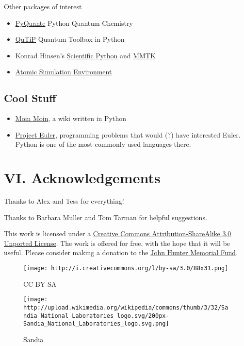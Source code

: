 \documentclass[11pt]{article}
\makeatletter
\def\maxwidth{\ifdim\Gin@nat@width>\linewidth\linewidth
    \else\Gin@nat@width\fi}
\let\Oldincludegraphics\includegraphics
\renewcommand{\includegraphics}[1]{\Oldincludegraphics[width=.8\maxwidth]{#1}}
\providecommand{\tightlist}{%
      \setlength{\itemsep}{0pt}\setlength{\parskip}{0pt}}
\makeatother
\begin{document}
Other packages of interest

\begin{itemize}
\tightlist
\item
  \href{http://pyquante.sf.net}{PyQuante} Python Quantum Chemistry
\item
  \href{https://code.google.com/p/qutip/}{QuTiP} Quantum Toolbox in
  Python
\item
  Konrad Hinsen's
  \href{http://dirac.cnrs-orleans.fr/plone/software/scientificpython/}{Scientific
  Python} and \href{http://dirac.cnrs-orleans.fr/MMTK/}{MMTK}
\item
  \href{https://wiki.fysik.dtu.dk/ase/}{Atomic Simulation Environment}
\end{itemize}

\subsection{Cool Stuff}\label{cool-stuff}

\begin{itemize}
\tightlist
\item
  \href{http://moinmo.in/}{Moin Moin}, a wiki written in Python
\item
  \href{http://projecteuler.net/}{Project Euler}, programming problems
  that would (?) have interested Euler. Python is one of the most
  commonly used languages there.
\end{itemize}

    \section{VI. Acknowledgements}\label{vi.-acknowledgements}

Thanks to Alex and Tess for everything!

Thanks to Barbara Muller and Tom Tarman for helpful suggestions.

    This work is licensed under a
\href{http://creativecommons.org/licenses/by-sa/3.0/deed.en_US}{Creative
Commons Attribution-ShareAlike 3.0 Unported License}. The work is
offered for free, with the hope that it will be useful. Please consider
making a donation to the \href{http://numfocus.org/johnhunter/}{John
Hunter Memorial Fund}.

\begin{figure}
\centering
\texttt{[image: http://i.creativecommons.org/l/by-sa/3.0/88x31.png]}
\caption{CC BY SA}
\end{figure}

\begin{figure}
\centering
\texttt{[image: http://upload.wikimedia.org/wikipedia/commons/thumb/3/32/Sandia\_National\_Laboratories\_logo.svg/200px-Sandia\_National\_Laboratories\_logo.svg.png]}
\caption{Sandia}
\end{figure}
\end{document}
